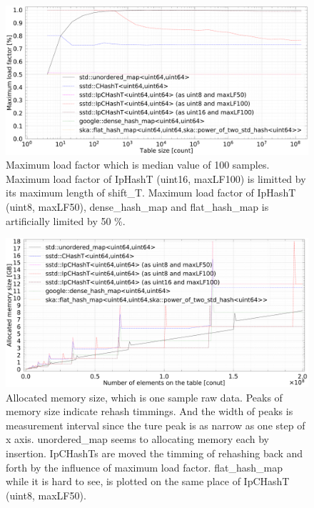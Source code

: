 \newpage
\begin{figure}[]
  \includegraphics[scale=0.24]{./fig_bench/maxLoadFactor_med.pdf}
  \caption{
    Maximum load factor which is median value of 100 samples.
    Maximum load factor of IpHashT (uint16, maxLF100) is limitted by its maximum length of shift\_T.
    Maximum load factor of IpHashT (uint8, maxLF50), dense\_hash\_map and flat\_hash\_map is artificially limited by 50 \%.
  }
  \label{fig_bench_LF}
\end{figure}


\begin{figure}[]
  \hspace{-1mm}
  \includegraphics[scale=0.24]{./fig_bench/usedMemory.pdf}
  \caption{
    Allocated memory size, which is one sample raw data.
    Peaks of memory size indicate rehash timmings.
    And the width of peaks is measurement interval since the ture peak is as narrow as one step of x axis.
    unordered\_map seems to allocating memory each by insertion.
    IpCHashTs are moved the timming of rehashing back and forth by the influence of maximum load factor.
    flat\_hash\_map while it is hard to see, is plotted on the same place of IpCHashT (uint8, maxLF50).
  }
  \label{fig_bench_memory}
\end{figure}

